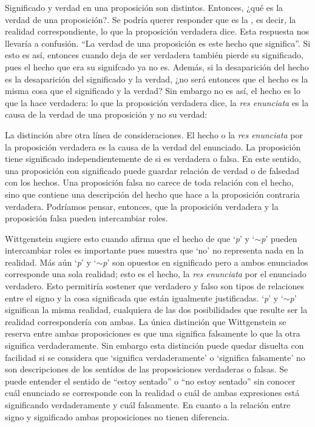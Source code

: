 Significado y verdad en una proposición son distintos. Entonces, ¿qué es la
verdad de una proposición?. Se podría querer responder que es la
, es decir, la realidad correspondiente, lo que
la proposición verdadera dice. Esta respuesta nos llevaría a confusión. ``La
verdad de una proposición es este hecho que significa''. Si esto es así,
entonces cuando deja de ser verdadera también pierde su significado, pues el
hecho que era su signifcado ya no es. Además, si la desaparición del hecho es la
desaparición del significado y la verdad, ¿no será entonces que el hecho es la
misma cosa que el significado y la verdad? Sin embargo no es así, el hecho es lo
que la hace verdadera: lo que la proposición verdadera dice, la \emph{res
  enunciata} es la causa de la verdad de una proposición y no su verdad:

La distinción abre otra línea de consideraciones. El hecho o la \emph{res
  enunciata} por la proposición verdadera es la causa de la verdad del
enunciado. La proposición tiene significado independientemente de si es
verdadera o falsa. En este sentido, una proposición con significado puede
guardar relación de verdad o de falsedad con los hechos. Una proposición falsa
no carece de toda relación con el hecho, sino que contiene una descripción del
hecho que hace a la proposición contraria verdadera. Podríamos pensar, entonces,
que la proposición verdadera y la proposición falsa pueden intercambiar roles.

Wittgenstein sugiere esto cuando afirma que el hecho de que `\emph{p}' y
`$\sim$\emph{p}' pueden intercambiar roles es importante pues muestra que `no'
no representa nada en la realidad. Más aún `\emph{p}' y `$\sim$\emph{p}' son
opuestos en significado pero a ambos enunciados corresponde una sola realidad;
esto es el hecho, la \emph{res enunciata} por el enunciado verdadero. Esto
permitiría sostener que verdadero y falso son tipos de relaciones entre el signo
y la cosa significada que están igualmente justificadas. `\emph{p}' y
`$\sim$\emph{p}' significan la misma realidad, cualquiera de las dos
posibilidades que resulte ser la realidad correspondería con ambas. La única
distinción que Wittgenstein se reserva entre ambas proposiciones es que una
significa falsamente lo que la otra significa verdaderamente. Sin embargo esta
distinción puede quedar disuelta con facilidad si se considera que `significa
verdaderamente' o `significa falsamente' no son descripciones de los sentidos de
las proposiciones verdaderas o falsas. Se puede entender el sentido de ``estoy
sentado'' o ``no estoy sentado'' sin conocer cuál enunciado se corresponde con
la realidad o cuál de ambas expresiones está significando verdaderamente y cuál
falsamente. En cuanto a la relación entre signo y significado ambas
proposiciones no tienen diferencia.

